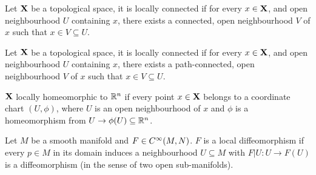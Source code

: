 \documentclass[../../main.tex]{subfiles}
\begin{document}
\begin{definition}\label{chp4:locally-connected-definition}
    Let ${\mathbf{X}}$ be a topological space, it is locally connected if for every $x\in{\mathbf{X}}$, and open neighbourhood $U$ containing $x$, there exists a connected, open neighbourhood $V$ of $x$ such that $x\in V\subseteq U$.
\end{definition}

\begin{definition}\label{chp4:locally-path-connected-definition}
    Let ${\mathbf{X}}$ be a topological space, it is locally connected if for every $x\in{\mathbf{X}}$, and open neighbourhood $U$ containing $x$, there exists a path-connected, open neighbourhood $V$ of $x$ such that $x\in V\subseteq U$.
\end{definition}

\begin{definition}\label{chp4:locally-homeomorphic-definition}
    ${\mathbf{X}}$ locally homeomorphic to ${\mathbb{R}^n}$ if every point $x\in{\mathbf{X}}$ belongs to a coordinate chart $(U,\phi)$, where $U$ is an open neighbourhood of $x$ and $\phi$ is a homeomorphism from $U\to\phi(U)\subseteq{\mathbb{R}^n}$.
\end{definition}

\begin{definition}\label{lee-chp4:local-diffeomorphism-definition}
    Let $M$ be a smooth manifold and $F\in \cinf[M,N]$. $F$ is a local diffeomorphism if every $p\in M$ in its domain induces a neighbourhood $U\subseteq M$ with $F|U:U\to F(U)$ is a diffeomorphism (in the sense of two open sub-manifolds).
\end{definition}





\newpage

\fexercisesHeader
\end{document}
